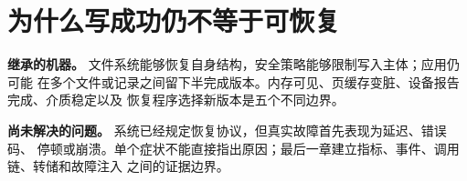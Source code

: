 \chapter{为什么写成功仍不等于可恢复}

\begin{statebox}
\textbf{继承的机器。} 文件系统能够恢复自身结构，安全策略能够限制写入主体；应用仍可能
在多个文件或记录之间留下半完成版本。内存可见、页缓存变脏、设备报告完成、介质稳定以及
恢复程序选择新版本是五个不同边界。
\end{statebox}


\begin{problemframe}
\textbf{尚未解决的问题。} 系统已经规定恢复协议，但真实故障首先表现为延迟、错误码、
停顿或崩溃。单个症状不能直接指出原因；最后一章建立指标、事件、调用链、转储和故障注入
之间的证据边界。
\end{problemframe}
